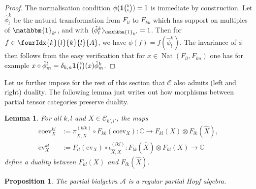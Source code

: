 \documentclass[10pt]{article}
\DeclareMathOperator{\Nat}{\mathrm{Nat}}
\newcommand{\C}{\mathbb{C}}
\newcommand{\CatCC}{\mathscr{C}}
\newcommand{\ev}{\mathrm{ev}}
\newcommand{\coev}{\mathrm{coev}}
\newcommand{\Grt}[3]{#1{\tiny {\begin{pmatrix} #2\\#3\end{pmatrix}}}}
\newcommand{\Unitb}{\mathbbm{1}}
\newcommand{\UnitC}[2]{\Grt{\mathbf{1}}{#1}{#2}}
\newcommand{\Gr}[5]{\fourIdx{#2}{#4}{#3}{#5}{#1}}%
\newtheorem{Lem}[Theorem]{Lemma}
\newtheorem{Prop}[Theorem]{Proposition}
\theoremstyle{definition}
\numberwithin{equation}{section}
\begin{document}
\begin{proof} The normalisation condition $\phi(\UnitC{k}{k})=1$ is immediate by construction. Let $\hat{\phi}^k_l$ be the natural transformation from $F_{ll}$ to $F_{kk}$ which has support on multiples of $\Unitb_{k'}$, and with $(\hat{\phi}^k_l)_{\Unitb_{k'}} = 1$.  Then for $f\in \Gr{A}{k}{k}{l}{l}$, we have $\phi(f) = f(\hat{\phi}^k_l)$. The invariance of $\phi$ then follows from the easy verification that for $x\in \Nat(F_{ll},F_{kn})$ one has for example $x\circ \hat{\phi}^l_m =\delta_{k,n} \UnitC{k}{l}(x)\hat{\phi}^k_m$. 
\end{proof}

Let us further impose for the rest of this section that $\CatCC$ also admits (left and right) duality.  The following lemma just writes out how morphisms between partial tensor categories preserve duality.
\begin{Lem}
  For all $k,l$ and $X\in \mathcal{C}_{k',l'}$,  the maps
  \begin{align*}
    \coev^{kl}_{X}  &:=  \pi^{(klk)}_{X,\hat X} \circ F_{kk}(\coev_{X})\colon \C \to F_{kl}(X)
    \otimes F_{lk}(\hat X), \\
    \ev^{kl}_{X} &:=  F_{ll}(\ev_{X}) \circ \iota^{(lkl)}_{\hat X,X} \colon
    F_{lk}(\hat X) \otimes F_{kl}(X) \to \C
  \end{align*}
  define a duality between $F_{kl}(X)$ and $F_{lk}(\hat X)$.
\end{Lem}

\begin{Prop}\label{PropAnti} The partial bialgebra $\mathscr{A}$ is a regular partial Hopf algebra.
\end{Prop} 
\end{document}
